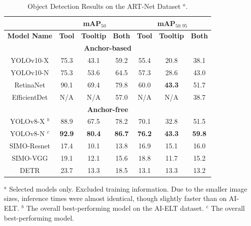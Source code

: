 \footnotesize
\begin{table}[htbp]
\centering
\caption{Object Detection Results on the ART-Net Dataset $^a$.}
\vspace*{-3mm}
\label{fig:artresults}
\begin{tabular}{|c|c|c|c|c|c|c|}
\hline
\multicolumn{1}{|c|}{} & \multicolumn{3}{c|}{\textbf{mAP$_{50}$}} & \multicolumn{3}{c|}{\textbf{mAP$_{50:95}$}} \\
\hline
\textbf{Model Name} & \textbf{Tool} & \textbf{Tooltip} & \textbf{Both} & \textbf{Tool} & \textbf{Tooltip} & \textbf{Both} \\ 
\hline
\multicolumn{7}{|c|}{\textbf{Anchor-based}} \\
\hline
YOLOv10-X & 75.3 & 43.1 & 59.2 & 55.4 & 20.8 & 38.1 \\
YOLOv10-N & 75.3 & 53.6 & 64.5 & 57.3 & 28.6 & 43.0 \\
RetinaNet & 90.1 & 69.4 & 79.8 & 60.0 & \textbf{43.3} & 51.7 \\
EfficientDet & N/A & N/A & 57.0 & N/A & N/A & 38.7 \\
\hline
\multicolumn{7}{|c|}{\textbf{Anchor-free}} \\
\hline
\rowcolor{pink} YOLOv8-X $^b$ & 88.9 & 67.5 & 78.2 & 70.1 & 32.8 & 51.5 \\
\rowcolor{yellow} YOLOv8-N $^c$ & \textbf{92.9} & \textbf{80.4} & \textbf{86.7} & \textbf{76.2} & \textbf{43.3} & \textbf{59.8} \\
SIMO-Resnet & 17.4 & 10.1 & 13.8 & 16.9 & 15.1 & 16.0 \\
SIMO-VGG & 19.1 & 12.1 & 15.6 & 18.8 & 11.7 & 15.2 \\
DETR & 23.7 & 13.3 & 18.5 & 13.1 & 13.3 & 13.2 \\
\hline
\end{tabular}
\newline
\scriptsize{$^a$ Selected models only. Excluded training information. Due to the smaller image sizes, inference times were almost identical, though slightly faster than on AI-ELT. $^b$ The overall best-performing model on the AI-ELT dataset. $^c$ The overall best-performing model.}
\vspace{-4mm}
\end{table}

